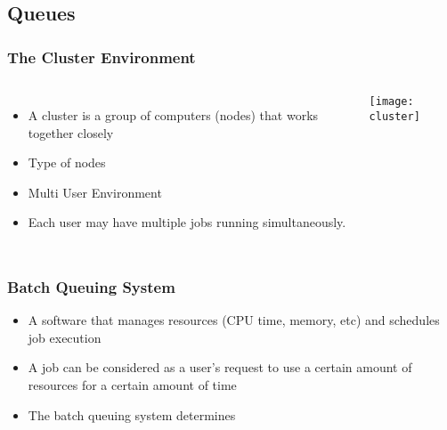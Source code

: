 \documentclass[slidestop,mathserif,compress,xcolor=svgnames,table]{beamer}
\newcommand*\vardiamond{\textcolor{tigerspurple}{%
  \ensuremath{\blacklozenge}}}
\newenvironment{bblock}[0]
{
\begin{beamerboxesrounded}[upper=uppercol1,lower=lowercol1,shadow=true]}
{\end{beamerboxesrounded}}
\begin{document}
\subsection{Queues}
\begin{frame}
\frametitle{\small The Cluster Environment}
\begin{columns}
\column{4cm}
\begin{itemize}
\item A cluster is a group of computers (nodes) that works together closely
\item Type of nodes
\item Multi User Environment
\item Each user may have multiple jobs running simultaneously.
\end{itemize}
\column{7cm}
\begin{center}
\texttt{[image: cluster]}
\end{center}
\end{columns}
\end{frame}

\begin{frame}
\frametitle{\small Batch Queuing System}
\begin{bblock}{}
\begin{itemize}
\item A software that manages resources (CPU time, memory, etc) and schedules job execution
\item A job can be considered as a user's request to use a certain amount of resources for a certain amount of time
\item The batch queuing system determines
\end{itemize}
\end{bblock}
\end{frame}
\end{document}
